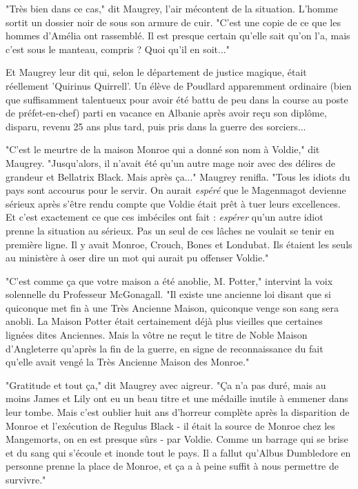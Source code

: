 "Très bien dans ce cas," dit Maugrey, l'air mécontent de la situation. L'homme sortit un dossier noir de sous son armure de cuir. "C'est une copie de ce que les hommes d'Amélia ont rassemblé. Il est presque certain qu'elle sait qu'on l'a, mais c'est sous le manteau, compris ? Quoi qu'il en soit..."

Et Maugrey leur dit qui, selon le département de justice magique, était réellement 'Quirinus Quirrell'. Un élève de Poudlard apparemment ordinaire (bien que suffisamment talentueux pour avoir été battu de peu dans la course au poste de préfet-en-chef) parti en vacance en Albanie après avoir reçu son diplôme, disparu, revenu 25 ans plus tard, puis pris dans la guerre des sorciers...

"C'est le meurtre de la maison Monroe qui a donné son nom à Voldie," dit Maugrey. "Jusqu'alors, il n'avait été qu'un autre mage noir avec des délires de grandeur et Bellatrix Black. Mais après ça..." Maugrey renifla. "Tous les idiots du pays sont accourus pour le servir. On aurait \emph{espéré } que le Magenmagot devienne sérieux après s'être rendu compte que Voldie était prêt à tuer leurs excellences. Et c'est exactement ce que ces imbéciles ont fait : \emph{espérer}  qu'un autre idiot prenne la situation au sérieux. Pas un seul de ces lâches ne voulait se tenir en première ligne. Il y avait Monroe, Crouch, Bones et Londubat. Ils étaient les seuls au ministère à oser dire un mot qui aurait pu offenser Voldie."

"C'est comme ça que votre maison a été anoblie, M. Potter," intervint la voix solennelle du Professeur McGonagall. "Il existe une ancienne loi disant que si quiconque met fin à une Très Ancienne Maison, quiconque venge son sang sera anobli. La Maison Potter était certainement déjà plus vieilles que certaines lignées dites Anciennes. Mais la vôtre ne reçut le titre de Noble Maison d'Angleterre qu'après la fin de la guerre, en signe de reconnaissance du fait qu'elle avait vengé la Très Ancienne Maison des Monroe."

"Gratitude et tout ça," dit Maugrey avec aigreur. "Ça n'a pas duré, mais au moins James et Lily ont eu un beau titre et une médaille inutile à emmener dans leur tombe. Mais c'est oublier huit ans d'horreur complète après la disparition de Monroe et l'exécution de Regulus Black - il était la source de Monroe chez les Mangemorts, on en est presque sûrs - par Voldie. Comme un barrage qui se brise et du sang qui s'écoule et inonde tout le pays. Il a fallut qu'Albus Dumbledore en personne prenne la place de Monroe, et ça a à peine suffit à nous permettre de survivre."

